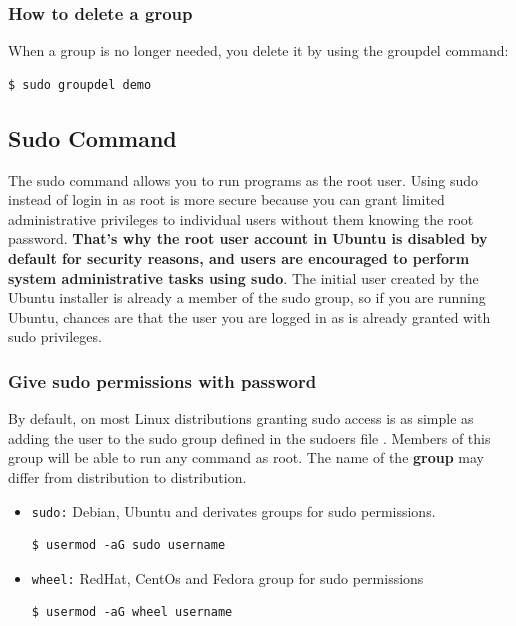 \documentclass{article}
\newenvironment{codetemplate}[1][]{%
  \mybasecolorbox[#1]
  \itshape
}{%
  \endmybasecolorbox
}
\begin{document}
\subsubsection{How to delete a group}
When a group is no longer needed, you delete it by using the groupdel command:

\begin{codetemplate}{}
\begin{verbatim}
$ sudo groupdel demo
\end{verbatim}
\end{codetemplate}

\subsection{Sudo Command}
The sudo command allows you to run programs as the root user. Using sudo instead of login in as root is more secure because you can grant limited administrative privileges to individual users without them knowing the root password. \textbf{That's why the root user account in Ubuntu is disabled by default for security reasons, and users are encouraged to perform system administrative tasks using sudo}. The initial user created by the Ubuntu installer is already a member of the sudo group, so if you are running Ubuntu, chances are that the user you are logged in as is already granted with sudo privileges.

\subsubsection{Give sudo permissions with password}
By default, on most Linux distributions granting sudo access is as simple as adding the user to the sudo group defined in the sudoers file . Members of this group will be able to run any command as root. The name of the \textbf{group} may differ from distribution to distribution.

\begin{itemize}
    \item \verb|sudo:| Debian, Ubuntu and derivates groups for sudo permissions.
\begin{codetemplate}{}
\begin{verbatim}
$ usermod -aG sudo username
\end{verbatim}
\end{codetemplate}
    \item \verb|wheel:| RedHat, CentOs and Fedora group for sudo permissions
\begin{codetemplate}{}
\begin{verbatim}
$ usermod -aG wheel username
\end{verbatim}
\end{codetemplate}
\end{itemize}
\end{document}
